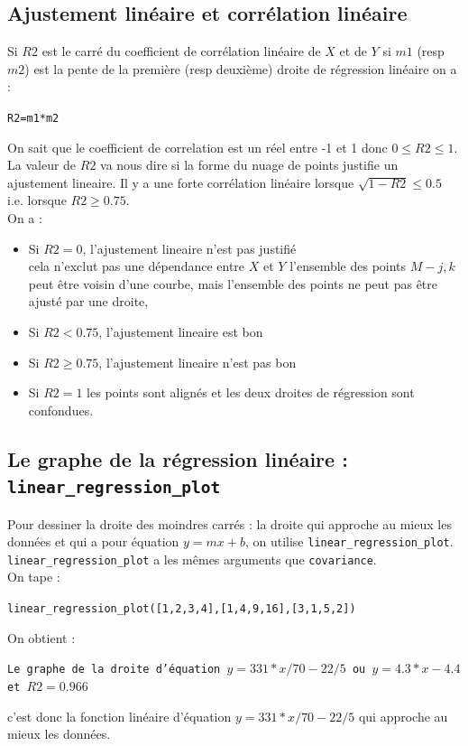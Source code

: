 \documentclass[a4paper,11pt]{book}
\begin{document}
\subsection{Ajustement lin\'eaire et corr\'elation lin\'eaire}
Si $R2$ est le carr\'e du coefficient de corr\'elation lin\'eaire de $X$ et de
$Y$ si $m1$ (resp $m2$) est la pente de la premi\`ere (resp deuxi\`eme) droite 
de r\'egression lin\'eaire on a :
\begin{center}{\tt R2=m1*m2}\end{center}
On sait que le coefficient de correlation est un r\'eel entre -1 et 1 donc
$0 \leq R2 \leq 1$. La valeur de $R2$ va nous dire si la forme du nuage de 
points justifie un ajustement lineaire. Il y a une forte corr\'elation 
lin\'eaire lorsque $\sqrt{1-R2} \leq 0.5$  i.e. lorsque $R2 \geq 0.75$.\\
On a :
\begin{itemize}
\item Si $R2=0$, l'ajustement lineaire n'est pas justifi\'e\\ 
cela n'exclut pas une d\'ependance entre $X$ et $Y$  l'ensemble des 
points $M-{j,k}$ peut \^etre voisin d'une courbe, mais l'ensemble des points ne
 peut pas \^etre ajust\'e par une droite,
\item Si $R2<0.75$,  l'ajustement lineaire est bon\\
\item Si $R2 \geq 0.75$,  l'ajustement lineaire n'est pas bon\\ 
\item Si $R2=1$ les points  sont align\'es et les deux droites de r\'egression sont confondues.
\end{itemize}

\subsection{Le graphe de la r\'egression lin\'eaire : {\tt linear\_regression\_plot}}
Pour dessiner la droite des moindres carr\'es : la droite qui approche au mieux
les donn\'ees et qui a pour 
\'equation $y=mx+b$, on utilise  {\tt linear\_regression\_plot}.\\
{\tt linear\_regression\_plot} a les m\^emes arguments que {\tt covariance}.\\
On tape :
\begin{center}{\tt linear\_regression\_plot([1,2,3,4],[1,4,9,16],[3,1,5,2])}\end{center}
On obtient :
\begin{center}{\tt Le graphe de la droite d'\'equation $y=331*x/70-22/5$ ou $y=4.3*x-4.4$ et $R2=0.966$}\end{center}
c'est donc la fonction lin\'eaire d'\'equation $y=331*x/70-22/5$ qui approche 
au mieux les donn\'ees.
\end{document}
